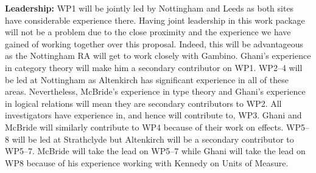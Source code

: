 \documentclass[a4paper,11pt]{article}
\begin{document}
{\bf Leadership:} WP1 will be jointly led by Nottingham and Leeds as
both sites have considerable experience there. Having joint leadership
in this work package will not be a problem due to the close proximity
and the experience we have gained of working together over this
proposal. Indeed, this will be advantageous as the Nottingham RA will
get to work closely with Gambino. Ghani's experience in category
theory will make him a secondary contributor on WP1. WP2--4 will be led
at Nottingham as Altenkirch has significant experience in all of these
areas. Nevertheless, McBride's experience in type theory and Ghani's
experience in logical relations will mean they are secondary
contributors to WP2. All investigators have experience in, and hence
will contribute to, WP3. Ghani and McBride will similarly contribute
to WP4 because of their work on effects. WP5--8 will be led at
Strathclyde but Altenkirch will be a secondary contributor to
WP5--7. McBride will take the lead on WP5--7 while Ghani will take
the lead on WP8 because of his experience working with Kennedy on
Units of Measure.
\end{document}
